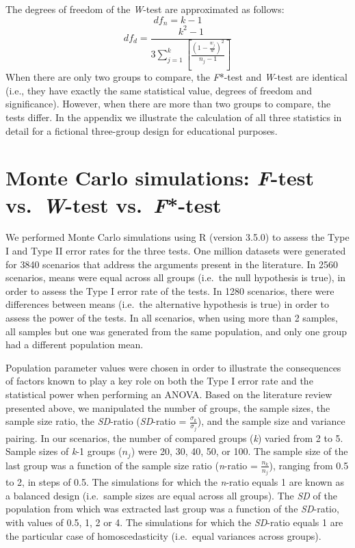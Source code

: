 \documentclass[man,floatsintext]{apa6}
\begin{document}
The degrees of freedom of the \emph{W}-test are approximated as follows:
\begin{equation} 
df_n= k-1
\label{eq:WnumDF}
\end{equation}
\begin{equation}
df_d= \frac{k^2-1}{3\sum_{j=1}^k[\frac{(1-\frac{w_j}{w})^2}{n_j-1}]}
\label{eq:WdenomDF}
\end{equation}
When there are only two groups to compare, the \emph{F}*-test and \emph{W}-test are identical (i.e., they have exactly the same statistical value, degrees of freedom and significance). However, when there are more than two groups to compare, the tests differ. In the appendix we illustrate the calculation of all three statistics in detail for a fictional three-group design for educational purposes.

\hypertarget{monte-carlo-simulations-f-test-vs.-w-test-vs.-f-test}{%
\section{\texorpdfstring{Monte Carlo simulations: \emph{F}-test vs.~\emph{W}-test vs.~\emph{F}*-test}{Monte Carlo simulations: F-test vs.~W-test vs.~F*-test}}\label{monte-carlo-simulations-f-test-vs.-w-test-vs.-f-test}}

We performed Monte Carlo simulations using R (version 3.5.0) to assess the Type I and Type II error rates for the three tests. One million datasets were generated for 3840 scenarios that address the arguments present in the literature. In 2560 scenarios, means were equal across all groups (i.e.~the null hypothesis is true), in order to assess the Type I error rate of the tests. In 1280 scenarios, there were differences between means (i.e.~the alternative hypothesis is true) in order to assess the power of the tests. In all scenarios, when using more than 2 samples, all samples but one was generated from the same population, and only one group had a different population mean.

Population parameter values were chosen in order to illustrate the consequences of factors known to play a key role on both the Type I error rate and the statistical power when performing an ANOVA. Based on the literature review presented above, we manipulated the number of groups, the sample sizes, the sample size ratio, the \emph{SD}-ratio (\emph{SD}-ratio = \(\frac{\sigma_k}{\sigma_j}\)), and the sample size and variance pairing. In our scenarios, the number of compared groups (\emph{k}) varied from 2 to 5. Sample sizes of \emph{k}-1 groups (\(n_j\)) were 20, 30, 40, 50, or 100. The sample size of the last group was a function of the sample size ratio (\emph{n}-ratio = \(\frac{n_k}{n_j}\)), ranging from 0.5 to 2, in steps of 0.5. The simulations for which the \emph{n}-ratio equals 1 are known as a balanced design (i.e.~sample sizes are equal across all groups). The \emph{SD} of the population from which was extracted last group was a function of the \emph{SD}-ratio, with values of 0.5, 1, 2 or 4. The simulations for which the \emph{SD}-ratio equals 1 are the particular case of homoscedasticity (i.e.~equal variances across groups).
\end{document}
